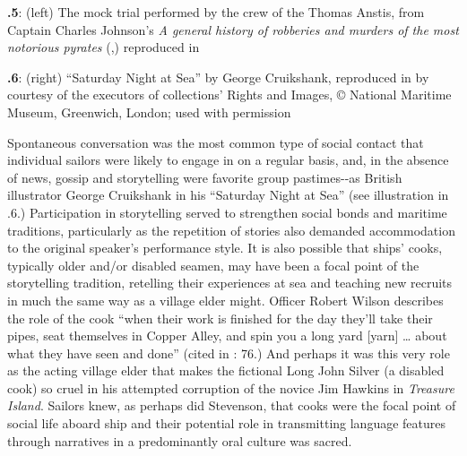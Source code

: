   
 

 

\textbf{.5}: (left) The mock trial performed by the crew of the Thomas Anstis, from Captain Charles Johnson’s \textit{A general history of robberies and murders of the most notorious pyrates} (\citealt{London1724},) reproduced in \citet[156]{Rediker2004} 

\textbf{.6}: (right) “Saturday Night at Sea” by George Cruikshank, reproduced in \citet[29,]{Dibdin1841} by courtesy of the executors of collections’ Rights and Images, © National Maritime Museum, Greenwich, London; used with permission

Spontaneous conversation was the most common type of social contact that individual sailors were likely to engage in on a regular basis, and, in the absence of news, gossip and storytelling were favorite group pastimes-{}-as British illustrator George Cruikshank in his “Saturday Night at Sea” (see illustration in .6.) Participation in storytelling served to strengthen social bonds and maritime traditions, particularly as the repetition of stories also demanded accommodation to the original speaker’s performance style. It is also possible that ships’ cooks, typically older and/or disabled seamen, may have been a focal point of the storytelling tradition, retelling their experiences at sea and teaching new recruits in much the same way as a village elder might. Officer Robert Wilson describes the role of the cook “when their work is finished for the day they’ll take their pipes, seat themselves in Copper Alley, and spin you a long yard [yarn] … about what they have seen and done” (cited in \citealt{AdkinsAdkins2008}: 76.) And perhaps it was this very role as the acting village elder that makes the fictional Long John Silver (a disabled cook) so cruel in his attempted corruption of the novice Jim Hawkins in  \textit{Treasure Island}. Sailors knew, as perhaps did Stevenson, that cooks were the focal point of social life aboard ship and their potential role in transmitting language features through narratives in a predominantly oral culture was sacred. 

